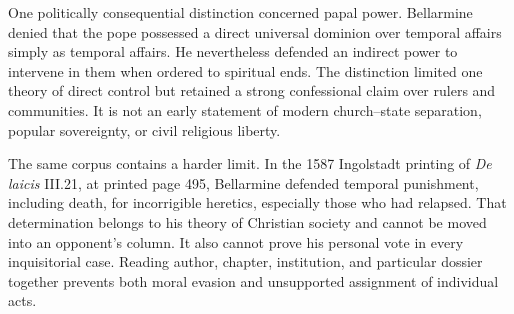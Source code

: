 One politically consequential distinction concerned papal power.  Bellarmine
denied that the pope possessed a direct universal dominion over temporal
affairs simply as temporal affairs.  He nevertheless defended an indirect
power to intervene in them when ordered to spiritual ends.  The distinction
limited one theory of direct control but retained a strong confessional claim
over rulers and communities.  It is not an early statement of modern
church--state separation, popular sovereignty, or civil religious liberty.

The same corpus contains a harder limit.  In the 1587 Ingolstadt printing of
\emph{De laicis} III.21, at printed page 495, Bellarmine defended temporal
punishment, including death, for incorrigible heretics, especially those who
had relapsed.  That
determination belongs to his theory of Christian society and cannot be moved
into an opponent's column.  It also cannot prove his personal vote in every
inquisitorial case.  Reading author, chapter, institution, and particular
dossier together prevents both moral evasion and unsupported assignment of
individual acts.

